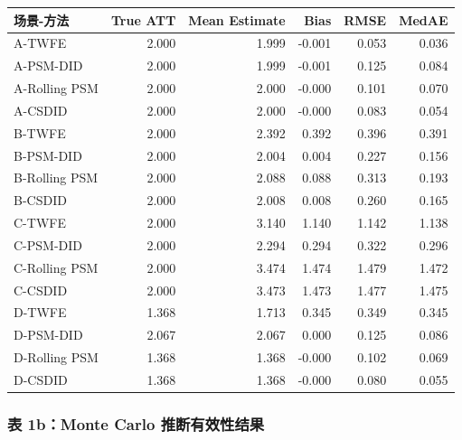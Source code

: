 \documentclass[
  fontset=windows]{ctexart}
\newcounter{none} %
\begin{document}
{\def\LTcaptype{none} %
\begin{longtable}[]{@{}lrrrrr@{}}
\toprule\noalign{}
场景-方法 & True ATT & Mean Estimate & Bias & RMSE & MedAE \\
\midrule\noalign{}
\endhead
\bottomrule\noalign{}
\endlastfoot
A-TWFE & 2.000 & 1.999 & -0.001 & 0.053 & 0.036 \\
A-PSM-DID & 2.000 & 1.999 & -0.001 & 0.125 & 0.084 \\
A-Rolling PSM & 2.000 & 2.000 & -0.000 & 0.101 & 0.070 \\
A-CSDID & 2.000 & 2.000 & -0.000 & 0.083 & 0.054 \\
B-TWFE & 2.000 & 2.392 & 0.392 & 0.396 & 0.391 \\
B-PSM-DID & 2.000 & 2.004 & 0.004 & 0.227 & 0.156 \\
B-Rolling PSM & 2.000 & 2.088 & 0.088 & 0.313 & 0.193 \\
B-CSDID & 2.000 & 2.008 & 0.008 & 0.260 & 0.165 \\
C-TWFE & 2.000 & 3.140 & 1.140 & 1.142 & 1.138 \\
C-PSM-DID & 2.000 & 2.294 & 0.294 & 0.322 & 0.296 \\
C-Rolling PSM & 2.000 & 3.474 & 1.474 & 1.479 & 1.472 \\
C-CSDID & 2.000 & 3.473 & 1.473 & 1.477 & 1.475 \\
D-TWFE & 1.368 & 1.713 & 0.345 & 0.349 & 0.345 \\
D-PSM-DID & 2.067 & 2.067 & 0.000 & 0.125 & 0.086 \\
D-Rolling PSM & 1.368 & 1.368 & -0.000 & 0.102 & 0.069 \\
D-CSDID & 1.368 & 1.368 & -0.000 & 0.080 & 0.055 \\
\end{longtable}
}

\subsubsection{表 1b：Monte Carlo
推断有效性结果}\label{ux8868-1bmonte-carlo-ux63a8ux65adux6709ux6548ux6027ux7ed3ux679c}
\end{document}
